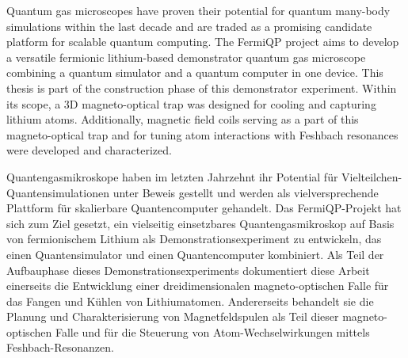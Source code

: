 Quantum gas microscopes have proven their potential for quantum many-body simulations within the last decade and are traded as a promising candidate platform for scalable quantum computing. The FermiQP project aims to develop a versatile fermionic lithium-based demonstrator quantum gas microscope combining a quantum simulator and a quantum computer in one device. This thesis is part of the construction phase of this demonstrator experiment. Within its scope, a 3D magneto-optical trap was designed for cooling and capturing lithium atoms. Additionally, magnetic field coils serving as a part of this magneto-optical trap and for tuning atom interactions with Feshbach resonances were developed and characterized.
\vspace{2cm}

Quantengasmikroskope haben im letzten Jahrzehnt ihr Potential für Vielteilchen-Quantensimulationen unter Beweis gestellt und werden als vielversprechende Plattform für skalierbare Quantencomputer gehandelt. Das FermiQP-Projekt hat sich zum Ziel gesetzt, ein vielseitig einsetzbares Quantengasmikroskop auf Basis von fermionischem Lithium als Demonstrationsexperiment zu entwickeln, das einen Quantensimulator und einen Quantencomputer kombiniert. Als Teil der Aufbauphase dieses Demonstrationsexperiments dokumentiert diese Arbeit einerseits die Entwicklung einer dreidimensionalen magneto-optischen Falle für das Fangen und Kühlen von Lithiumatomen. Andererseits behandelt sie die Planung und Charakterisierung von Magnetfeldspulen als Teil dieser magneto-optischen Falle und für die Steuerung von Atom-Wechselwirkungen mittels Feshbach-Resonanzen.